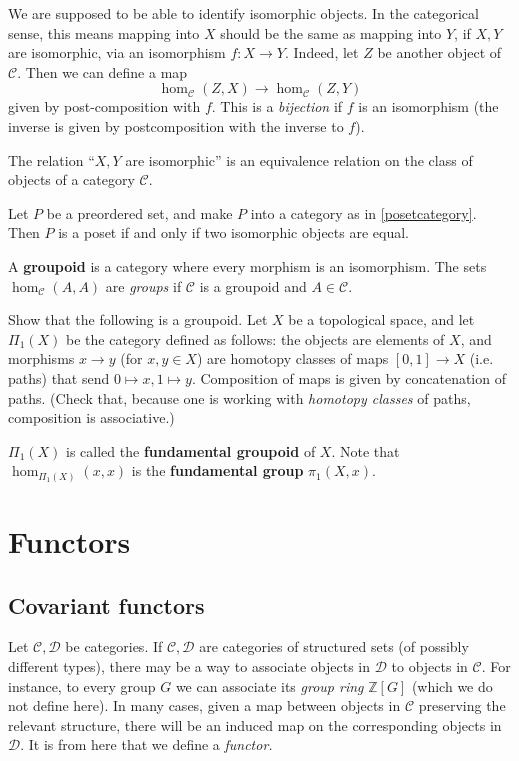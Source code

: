 We are supposed to be able to identify isomorphic objects. In the categorical
sense, this means mapping into $X$ should be the same as mapping into $Y$, if
$X, Y$ are isomorphic, via an isomorphism $f: X \to Y$.
Indeed, let 
$Z$ be another object of $\mathcal{C}$.
Then we can define a map
\[ \hom_{\mathcal{C}}(Z, X) \to \hom_{\mathcal{C}}(Z, Y)  \]
given by post-composition with $f$. This is a \emph{bijection} if $f$ is an
isomorphism (the inverse is given by postcomposition with the inverse to $f$).

\begin{exercise} 
The relation ``$X, Y$ are isomorphic'' is an equivalence relation on the class
of objects of a category $\mathcal{C}$.
\end{exercise} 

\begin{exercise} 
Let $P$ be a preordered set, and make $P$ into a category as in
\cref{posetcategory}. Then $P$ is a poset if and only if two isomorphic objects
are equal.
\end{exercise} 

\begin{exercise} 
A \textbf{groupoid} is a category where every morphism is an isomorphism. The
sets $\hom_{\mathcal{C}}(A, A)$ are \emph{groups} if $\mathcal{C}$ is a
groupoid and $A \in \mathcal{C}$.
\end{exercise}

\begin{exercise}

Show that the following is a groupoid. Let $X$ be a topological space, and let
$\Pi_1(X)$ be the category defined as follows: the objects are elements of $X$,
and morphisms $x \to y$ (for $x,y \in X$) are homotopy classes of maps $[0,1]
\to X$ (i.e. paths) that send $0 \mapsto x, 1 \mapsto y$. Composition of maps
is given by concatenation of paths.
(Check that, because one is working with \emph{homotopy classes} of paths,
composition is associative.)

$\Pi_1(X)$ is called the \textbf{fundamental groupoid} of $X$. Note that
$\hom_{\Pi_1(X)}(x, x)$ is the \textbf{fundamental group} $\pi_1(X, x)$.
\end{exercise} 


\section{Functors}

\subsection{Covariant functors}
Let $\mathcal{C}, \mathcal{D}$ be categories. If $\mathcal{C}, \mathcal{D}$
are categories of structured sets (of possibly different types), there may be a
way to associate objects in $\mathcal{D}$ to objects in $\mathcal{C}$. For
instance, to every group $G$ we can associate its \emph{group ring}
$\mathbb{Z}[G]$
 (which we do not define here).
In many cases, given a map between objects in $\mathcal{C}$ preserving the
relevant structure, there will be an induced map on the corresponding objects
in $\mathcal{D}$. It is from here that we define a \emph{functor.}


